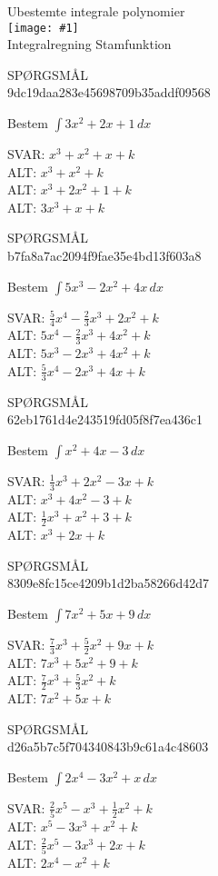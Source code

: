 \documentclass[]{article}
\newcounter{spgcounter}
\newenvironment{question}[2]{\addtocounter{spgcounter}{1} SPØRGSMÅL \thespgcounter\\}{\hspace{50px}}
\newcommand{\name}[1]{{\huge #1}\\}
\newcommand{\tag}[1]{#1}
\newcommand{\cover}[1]{\texttt{[image: \#1]}\\}
\newcommand{\answer}[1]{{\color{green} SVAR: #1}\\}
\newcommand{\alt}[1]{{\color{red} ALT: #1}\\}
\begin{document}
\name{Ubestemte integrale polynomier}
\cover{integralepolynomier.png}
\tag{Integralregning}
\tag{Stamfunktion}

\begin{question}{multi}\id{9dc19daa283e45698709b35addf09568}

Bestem $\int{3x^2+2x+1}\, dx$

\answer{$x^3 + x^2 + x + k$}
\alt{$x^3 + x^2 + k$}
\alt{$x^3 + 2x^2 + 1 + k$}
\alt{$3x^3 + x + k$}

\end{question}

\begin{question}{multi}\id{b7fa8a7ac2094f9fae35e4bd13f603a8}

Bestem $\int{5x^3 - 2x^2 + 4x}\, dx$

\answer{$\frac{5}{4}x^4 - \frac{2}{3}x^3 + 2x^2 + k$}
\alt{$5x^4 - \frac{2}{3}x^3 + 4x^2 + k$}
\alt{$5x^3 - 2x^3 + 4x^2 + k$}
\alt{$\frac{5}{3}x^4 - 2x^3 + 4x + k$}

\end{question}

\begin{question}{multi}\id{62eb1761d4e243519fd05f8f7ea436c1}

Bestem $\int{x^2 + 4x - 3}\, dx$

\answer{$\frac{1}{3}x^3 + 2x^2 - 3x + k$}
\alt{$x^3 + 4x^2 - 3 + k$}
\alt{$\frac{1}{2}x^3 + x^2 + 3 + k$}
\alt{$x^3 + 2x + k$}

\end{question}

\begin{question}{multi}\id{8309e8fc15ce4209b1d2ba58266d42d7}

Bestem $\int{7x^2 + 5x + 9}\, dx$

\answer{$\frac{7}{3}x^3 + \frac{5}{2}x^2 + 9x + k$}
\alt{$7x^3 + 5x^2 + 9 + k$}
\alt{$\frac{7}{2}x^3 + \frac{5}{3}x^2 + k$}
\alt{$7x^2 + 5x + k$}

\end{question}

\begin{question}{multi}\id{d26a5b7c5f704340843b9c61a4c48603}

Bestem $\int{2x^4 - 3x^2 + x}\, dx$

\answer{$\frac{2}{5}x^5 - x^3 + \frac{1}{2}x^2 + k$}
\alt{$x^5 - 3x^3 + x^2 + k$}
\alt{$\frac{2}{5}x^5 - 3x^3 + 2x + k$}
\alt{$2x^4 - x^2 + k$}

\end{question}
\end{document}
